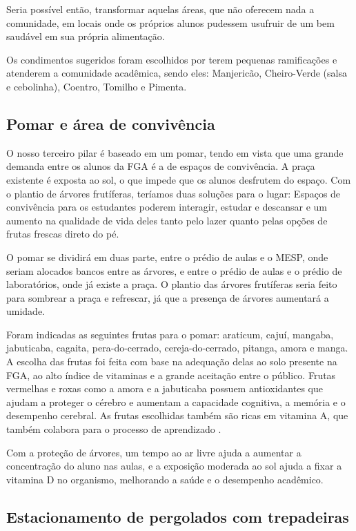   Seria possível então, transformar aquelas áreas, que não oferecem nada a comunidade, em locais onde os próprios alunos pudessem
   usufruir de um bem saudável em sua própria alimentação.

   Os condimentos sugeridos foram escolhidos por terem pequenas ramificações e atenderem a comunidade acadêmica, sendo eles:
   Manjericão, Cheiro-Verde (salsa e cebolinha), Coentro, Tomilho e Pimenta.

\subsection{Pomar e área de convivência}

  O nosso terceiro pilar é baseado em um pomar, tendo em vista que uma grande demanda entre os alunos da FGA é a de espaços de convivência.
  A praça existente é exposta ao sol, o que impede que os alunos desfrutem do espaço. Com o plantio de árvores frutíferas, teríamos duas
  soluções para o lugar: Espaços de convivência para os estudantes poderem interagir, estudar e descansar e um aumento na qualidade de vida
  deles tanto pelo lazer quanto pelas opções de frutas frescas direto do pé.

  O pomar se dividirá em duas parte, entre o prédio de aulas e o MESP, onde seriam alocados bancos entre as árvores, e entre o prédio de
  aulas e o prédio de laboratórios, onde já existe a praça. O plantio das árvores frutíferas seria feito para sombrear a praça e refrescar,
  já  que a presença de  árvores aumentará a umidade.

  Foram indicadas as seguintes frutas para o pomar: araticum, cajuí, mangaba, jabuticaba, cagaita, pera-do-cerrado, cereja-do-cerrado,
  pitanga, amora e manga. A escolha das frutas foi feita com base na adequação delas ao solo presente na FGA, ao alto índice de
  vitaminas e a grande aceitação entre o público. Frutas vermelhas e roxas como a amora e a jabuticaba possuem antioxidantes que ajudam a
  proteger o cérebro e aumentam a capacidade cognitiva, a memória e o desempenho cerebral. As frutas escolhidas também são ricas em
  vitamina A, que também colabora para o processo de aprendizado \cite{nutricao7}.

  Com a proteção de árvores, um tempo ao ar livre ajuda a aumentar a concentração do aluno nas aulas, e a exposição moderada ao sol
  ajuda a fixar a vitamina D no organismo, melhorando a saúde e o desempenho acadêmico.

\subsection{Estacionamento de pergolados com trepadeiras}

